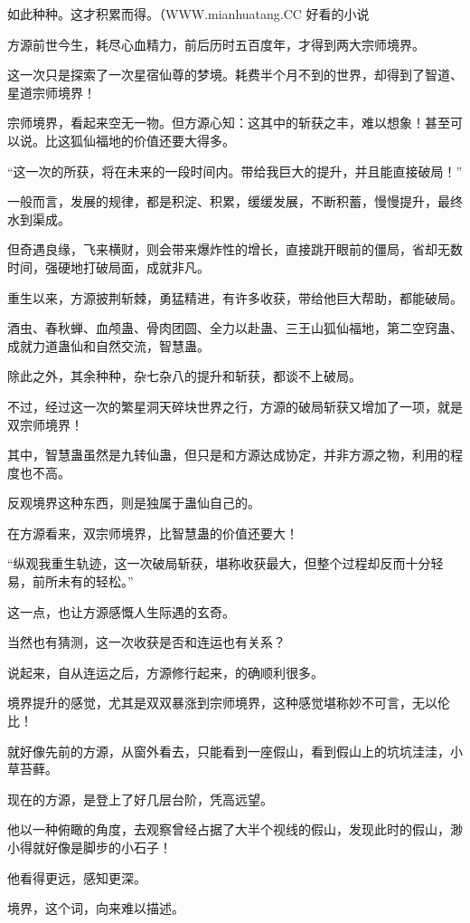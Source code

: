 \begin{this_body}
如此种种。这才积累而得。（WWW.mianhuatang.CC 好看的小说

方源前世今生，耗尽心血精力，前后历时五百度年，才得到两大宗师境界。

这一次只是探索了一次星宿仙尊的梦境。耗费半个月不到的世界，却得到了智道、星道宗师境界！

宗师境界，看起来空无一物。但方源心知：这其中的斩获之丰，难以想象！甚至可以说。比这狐仙福地的价值还要大得多。

“这一次的所获，将在未来的一段时间内。带给我巨大的提升，并且能直接破局！”

一般而言，发展的规律，都是积淀、积累，缓缓发展，不断积蓄，慢慢提升，最终水到渠成。

但奇遇良缘，飞来横财，则会带来爆炸性的增长，直接跳开眼前的僵局，省却无数时间，强硬地打破局面，成就非凡。

重生以来，方源披荆斩棘，勇猛精进，有许多收获，带给他巨大帮助，都能破局。

酒虫、春秋蝉、血颅蛊、骨肉团圆、全力以赴蛊、三王山狐仙福地，第二空窍蛊、成就力道蛊仙和自然交流，智慧蛊。

除此之外，其余种种，杂七杂八的提升和斩获，都谈不上破局。

不过，经过这一次的繁星洞天碎块世界之行，方源的破局斩获又增加了一项，就是双宗师境界！

其中，智慧蛊虽然是九转仙蛊，但只是和方源达成协定，并非方源之物，利用的程度也不高。

反观境界这种东西，则是独属于蛊仙自己的。

在方源看来，双宗师境界，比智慧蛊的价值还要大！

“纵观我重生轨迹，这一次破局斩获，堪称收获最大，但整个过程却反而十分轻易，前所未有的轻松。”

这一点，也让方源感慨人生际遇的玄奇。

当然也有猜测，这一次收获是否和连运也有关系？

说起来，自从连运之后，方源修行起来，的确顺利很多。

境界提升的感觉，尤其是双双暴涨到宗师境界，这种感觉堪称妙不可言，无以伦比！

就好像先前的方源，从窗外看去，只能看到一座假山，看到假山上的坑坑洼洼，小草苔藓。

现在的方源，是登上了好几层台阶，凭高远望。

他以一种俯瞰的角度，去观察曾经占据了大半个视线的假山，发现此时的假山，渺小得就好像是脚步的小石子！

他看得更远，感知更深。

境界，这个词，向来难以描述。


\end{this_body}
